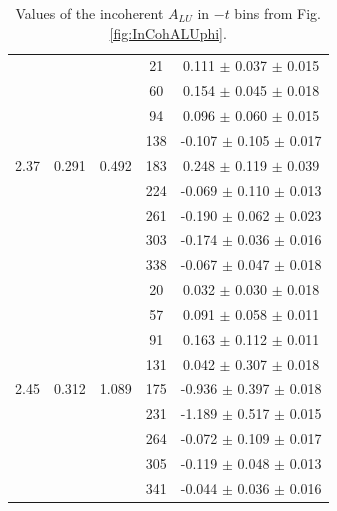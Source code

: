 \documentclass[aps,prc,preprint,superscriptaddress]{revtex4}
\begin{document}
\begin{table}[!h]
\begin{center}
\begin{tabular}{|c|c|c|c|c|}
        &       &        &   21    &  0.111   $\pm$  0.037  $\pm$ 0.015  \\
        &       &        &   60    &  0.154   $\pm$  0.045  $\pm$ 0.018  \\
        &       &        &   94    &  0.096   $\pm$  0.060  $\pm$ 0.015  \\
        &       &        &  138    & -0.107   $\pm$  0.105  $\pm$ 0.017  \\
  2.37  & 0.291 & 0.492  &  183    &  0.248   $\pm$  0.119  $\pm$ 0.039  \\
        &       &        &  224    & -0.069   $\pm$  0.110  $\pm$ 0.013  \\
        &       &        &  261    & -0.190   $\pm$  0.062  $\pm$ 0.023  \\
        &       &        &  303    & -0.174   $\pm$  0.036  $\pm$ 0.016  \\
        &       &        &  338    & -0.067   $\pm$  0.047  $\pm$ 0.018  \\
  \hline 
        &       &        &   20    &  0.032   $\pm$  0.030  $\pm$ 0.018  \\
        &       &        &   57    &  0.091   $\pm$  0.058  $\pm$ 0.011  \\
        &       &        &   91    &  0.163   $\pm$  0.112  $\pm$ 0.011  \\
        &       &        &  131    &  0.042   $\pm$  0.307  $\pm$ 0.018  \\
  2.45  & 0.312 & 1.089  &  175    & -0.936   $\pm$  0.397  $\pm$ 0.018  \\
        &       &        &  231    & -1.189   $\pm$  0.517  $\pm$ 0.015  \\
        &       &        &  264    & -0.072   $\pm$  0.109  $\pm$ 0.017  \\
        &       &        &  305    & -0.119   $\pm$  0.048  $\pm$ 0.013  \\
        &       &        &  341    & -0.044   $\pm$  0.036  $\pm$ 0.016  \\
 \hline
 \end{tabular}
 \caption{Values of the incoherent $A_{LU}$ in $-t$ bins from Fig. \ref{fig:InCohALUphi}.}
 \label{table:InCoh_t_BSA}
 \end{center}
\end{table}
\end{document}
